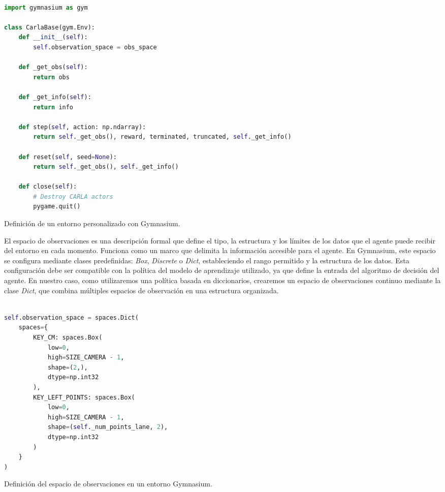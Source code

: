 \begin{code}[H]
\begin{lstlisting}[language=Python]

import gymnasium as gym

class CarlaBase(gym.Env):
    def __init__(self):
        self.observation_space = obs_space
    
    def _get_obs(self):
        return obs
    
    def _get_info(self):
        return info
    
    def step(self, action: np.ndarray):
        return self._get_obs(), reward, terminated, truncated, self._get_info()
   
    def reset(self, seed=None):
        return self._get_obs(), self._get_info()
    
    def close(self):
        # Destroy CARLA actors
        pygame.quit()

\end{lstlisting}
\caption[Definición de un entorno personalizado en Gymnasium]{Definición de un entorno personalizado con Gymnasium.}
\label{cod:gym}
\end{code}

El espacio de observaciones es una descripción formal que define el tipo, la estructura y los límites de los datos que el agente puede recibir del entorno en cada momento. Funciona como un marco que delimita la información accesible para el agente. En Gymnasium, este espacio se configura mediante clases predefinidas: \textit{Box}, \textit{Discrete} o \textit{Dict}, estableciendo el rango permitido y la estructura de los datos. Esta configuración debe ser compatible con la política del modelo de aprendizaje utilizado, ya que define la entrada del algoritmo de decisión del agente. En nuestro caso, como utilizaremos una política basada en diccionarios, crearemos un espacio de observaciones continuo mediante la clase \textit{Dict}, que combina múltiples espacios de observación en una estructura organizada.

\begin{code}[H]
\begin{lstlisting}[language=Python]

self.observation_space = spaces.Dict(
	spaces={
		KEY_CM: spaces.Box(
			low=0,
			high=SIZE_CAMERA - 1,
			shape=(2,),
			dtype=np.int32
		),
		KEY_LEFT_POINTS: spaces.Box(
			low=0,
			high=SIZE_CAMERA - 1,
			shape=(self._num_points_lane, 2),
			dtype=np.int32
		)
	}
)

\end{lstlisting}
\caption[Definición del espacio de observaciones en un entorno Gymnasium]{Definición del espacio de observaciones en un entorno Gymnasium.}
\label{cod:gymobs}
\end{code}

